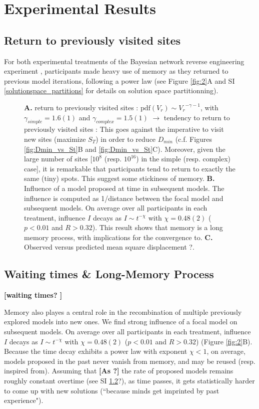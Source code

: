 \section{Experimental Results}

\subsection{Return to previously visited sites}
For both experimental treatments of the Bayesian network reverse engineering experiment \cite{}, participants made heavy use of memory as they returned to previous model iterations, following a power law (see Figure \ref{fig:2}A and SI \ref{solutionspace_partitions} for details on solution space partitionning).\\

\begin{figure}[h!]
\begin{center}
\caption{\footnotesize{{\bf A.} return to previously visited sites : $\mathrm{pdf}(V_r) \sim {V_r}^{- \gamma -1}$, with $\gamma_{simple} = 1.6(1)$ and $\gamma_{complex} = 1.5(1)$ $\rightarrow$ tendency to return to previously visited sites : This goes against the imperative to visit new sites (maximize $S_T$) in order to reduce $D_{min}$ (c.f. Figures \ref{fig:Dmin_vs_St}B and \ref{fig:Dmin_vs_St}C). Moreover, given the large number of sites [$10^{8}$ (resp. $10^{16}$) in the simple (resp. complex) case], it is remarkable that participants tend to return to exactly the same (tiny) spots. This suggest some stickiness of memory. {\bf B.} Influence of a model proposed at time in subsequent models. The influence is computed as 1/distance between the focal model and subsequent models. On average over all participants in each treatment, influence $I$ decays as $I \sim t^{-\chi}$ with $\chi = 0.48(2)$ ($p < 0.01$ and $R > 0.32$). This result shows that memory is a long memory process, with implications for the convergence to. {\bf C.} Observed versus predicted mean square displacement ?.}}
\label{fig:3}
\end{center}
\end{figure}

\subsection{Waiting times \& Long-Memory Process}

{\bf [waiting times? ]}

Memory also playes a central role in the recombination of multiple previously explored models into new ones. We find strong influence of a focal model on subsequent models. On average over all participants in each treatment, influence $I$ decays as $I \sim t^{-\chi}$ with $\chi = 0.48(2)$ ($p < 0.01$ and $R > 0.32$)  (Figure \ref{fig:2}B). Because the time decay exhibits a power law with exponent $\chi < 1$, on average, models proposed in the past never vanish from memory, and may be reused (resp. inspired from). Assuming that {\bf [As ?]} the rate of proposed models remains roughly constant  overtime (see SI \ref{}?), as time passes, it gets statistically harder to come up with new solutions (``because minds get imprinted by past experience"). 


